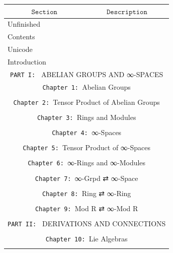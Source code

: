 \documentclass{book}
\theoremstyle{definition}
\begin{document}
{
\footnotesize
\begin{longtable}{|| l || l ||} 
\hline
\multicolumn{1}{||c||}{$\texttt{Section}$} & \multicolumn{1}{|c||}{$\texttt{Description}$} \\
\hline
\hline
Unfinished & \\
\hline
Contents & \\
\hline
Unicode & \\
\hline
Introduction & \\
\hline \hline
\multicolumn{2}{||c||}{\texttt{PART I: } ABELIAN GROUPS AND ∞-SPACES} \\
\hline \hline
 \multicolumn{2}{||c||}{\texttt{Chapter 1: }Abelian Groups} \\
\hline \hline
 &  \\
\hline \hline
 \multicolumn{2}{||c||}{\texttt{Chapter 2: }Tensor Product of Abelian Groups} \\
\hline \hline
 &  \\
 \hline \hline
 \multicolumn{2}{||c||}{\texttt{Chapter 3: }Rings and Modules} \\
\hline \hline
 &  \\
 \hline \hline
 \multicolumn{2}{||c||}{\texttt{Chapter 4: }∞-Spaces} \\
\hline \hline
 &  \\
\hline \hline
\multicolumn{2}{||c||}{\texttt{Chapter 5: }Tensor Product of ∞-Spaces} \\
\hline \hline
 &  \\
 \hline \hline
  \multicolumn{2}{||c||}{\texttt{Chapter 6: }∞-Rings and ∞-Modules} \\
\hline \hline
 &  \\
 \hline \hline
 \multicolumn{2}{||c||}{\texttt{Chapter 7: }∞-Grpd ⇄ ∞-Space} \\
\hline \hline
 &  \\
\hline \hline
 \multicolumn{2}{||c||}{\texttt{Chapter 8: }Ring ⇄ ∞-Ring} \\
\hline \hline
 &  \\
\hline \hline
 \multicolumn{2}{||c||}{\texttt{Chapter 9: }Mod R ⇄ ∞-Mod R} \\
\hline \hline
 &  \\
\hline \hline
\multicolumn{2}{||c||}{\texttt{PART II: } DERIVATIONS AND CONNECTIONS} \\
\hline \hline
 &  \\
\hline \hline
\multicolumn{2}{||c||}{\texttt{Chapter 10: }Lie Algebras} \\
\hline \hline
 &  \\

\end{longtable}}
\end{document}
